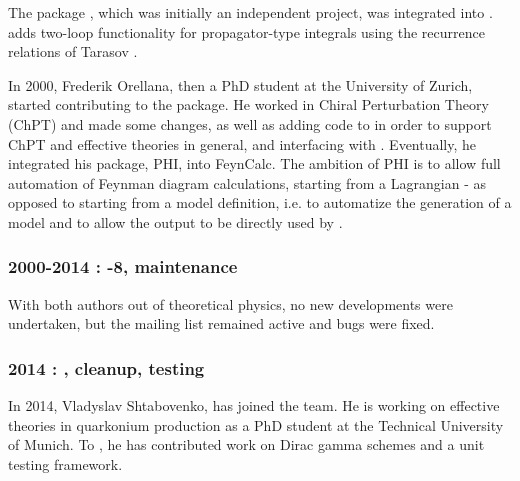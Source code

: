 The package \tarcer, which was initially an independent project, was integrated
into \fc. \tarcer \cite{Mertig:1998vk} adds two-loop functionality for propagator-type integrals
using the recurrence relations of Tarasov \cite{Tarasov:1997kx}.

In 2000, Frederik Orellana, then a PhD student at the University of Zurich,
started contributing to the package.
He worked in Chiral Perturbation Theory \cite{Gasser:1984gg} (ChPT) and made some changes, as well
as adding code to \fc in order to support ChPT and effective theories in general, and interfacing
with \fa. Eventually, he integrated his package, PHI, into FeynCalc. The
ambition of PHI is to allow full automation of Feynman diagram calculations,
starting from a Lagrangian - as opposed to starting from a \fa model definition,
i.e. to automatize the generation of a \fa model and to allow the \fa output to
be directly used by \fc.

\subsubsection*{2000-2014 : -8, maintenance}

With both authors out of theoretical physics, no new developments were
undertaken, but the mailing list remained active and bugs were fixed.

\subsubsection*{2014 : , cleanup, testing}

In 2014, Vladyslav Shtabovenko, has joined the team. He is working on effective
theories in quarkonium production as a PhD student at the Technical University
of Munich. To \fc, he has contributed work on Dirac gamma schemes and a unit
testing framework.
